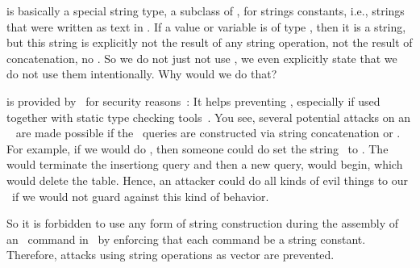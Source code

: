  is basically a special string type, a subclass of , for strings constants, i.e., strings that were written as text in \python.
If a value or variable is of type , then it is a string, but this string is explicitly not the result of any string operation, not the result of concatenation, no .
So we do not just not use , we even explicitly state that we do not use them intentionally.
Why would we do that?%
%
\begin{sloppypar}%
 is provided by \python\ for security reasons~\cite{PEP675}:
It helps preventing , especially if used together with static type checking tools~\cite{PEP675,VDGE2022PPDAFP:ST}.
You see, several potential attacks on an \sql\  are made possible if the \sql\ queries are constructed via string concatenation or .
For example, if we would do , then someone could do set the string~ to .
The \textil{);} would terminate the insertiong query and then a new query,  would begin, which would delete the table.
Hence, an attacker could do all kinds of evil things to our \db\ if we would not guard against this kind of behavior.
\end{sloppypar}%
%
So it is forbidden to use any form of string construction during the assembly of an \sql\ command in \psycopg\ by enforcing that each command be a string constant.
Therefore, attacks using string operations as vector are prevented.

